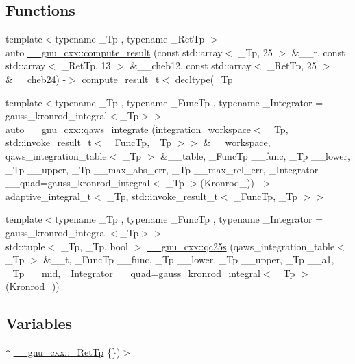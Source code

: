 \subsection*{Functions}
\begin{DoxyCompactItemize}
\item 
{\footnotesize template$<$typename \+\_\+\+Tp , typename \+\_\+\+Ret\+Tp $>$ }\\auto \hyperlink{namespace____gnu__cxx_a10e06852570922cdc1aca86883b5161e}{\+\_\+\+\_\+gnu\+\_\+cxx\+::compute\+\_\+result} (const std\+::array$<$ \+\_\+\+Tp, 25 $>$ \&\+\_\+\+\_\+r, const std\+::array$<$ \+\_\+\+Ret\+Tp, 13 $>$ \&\+\_\+\+\_\+cheb12, const std\+::array$<$ \+\_\+\+Ret\+Tp, 25 $>$ \&\+\_\+\+\_\+cheb24) -\/$>$ compute\+\_\+result\+\_\+t$<$ decltype(\+\_\+\+Tp
\item 
{\footnotesize template$<$typename \+\_\+\+Tp , typename \+\_\+\+Func\+Tp , typename \+\_\+\+Integrator  = gauss\+\_\+kronrod\+\_\+integral$<$\+\_\+\+Tp$>$$>$ }\\auto \hyperlink{namespace____gnu__cxx_a6196743b26626cc5add8395c6338f38a}{\+\_\+\+\_\+gnu\+\_\+cxx\+::qaws\+\_\+integrate} (integration\+\_\+workspace$<$ \+\_\+\+Tp, std\+::invoke\+\_\+result\+\_\+t$<$ \+\_\+\+Func\+Tp, \+\_\+\+Tp $>$$>$ \&\+\_\+\+\_\+workspace, qaws\+\_\+integration\+\_\+table$<$ \+\_\+\+Tp $>$ \&\+\_\+\+\_\+table, \+\_\+\+Func\+Tp \+\_\+\+\_\+func, \+\_\+\+Tp \+\_\+\+\_\+lower, \+\_\+\+Tp \+\_\+\+\_\+upper, \+\_\+\+Tp \+\_\+\+\_\+max\+\_\+abs\+\_\+err, \+\_\+\+Tp \+\_\+\+\_\+max\+\_\+rel\+\_\+err, \+\_\+\+Integrator \+\_\+\+\_\+quad=gauss\+\_\+kronrod\+\_\+integral$<$ \+\_\+\+Tp $>$(Kronrod\+\_)) -\/$>$ adaptive\+\_\+integral\+\_\+t$<$ \+\_\+\+Tp, std\+::invoke\+\_\+result\+\_\+t$<$ \+\_\+\+Func\+Tp, \+\_\+\+Tp $>$$>$
\item 
{\footnotesize template$<$typename \+\_\+\+Tp , typename \+\_\+\+Func\+Tp , typename \+\_\+\+Integrator  = gauss\+\_\+kronrod\+\_\+integral$<$\+\_\+\+Tp$>$$>$ }\\std\+::tuple$<$ \+\_\+\+Tp, \+\_\+\+Tp, bool $>$ \hyperlink{namespace____gnu__cxx_a5659189e193b420e201b6769d65289b9}{\+\_\+\+\_\+gnu\+\_\+cxx\+::qc25s} (qaws\+\_\+integration\+\_\+table$<$ \+\_\+\+Tp $>$ \&\+\_\+\+\_\+t, \+\_\+\+Func\+Tp \+\_\+\+\_\+func, \+\_\+\+Tp \+\_\+\+\_\+lower, \+\_\+\+Tp \+\_\+\+\_\+upper, \+\_\+\+Tp \+\_\+\+\_\+a1, \+\_\+\+Tp \+\_\+\+\_\+mid, \+\_\+\+Integrator \+\_\+\+\_\+quad=gauss\+\_\+kronrod\+\_\+integral$<$ \+\_\+\+Tp $>$(Kronrod\+\_))
\end{DoxyCompactItemize}
\subsection*{Variables}
\begin{DoxyCompactItemize}
\item 
$\ast$ \hyperlink{namespace____gnu__cxx_a886e03ece3d53ff7fa6c098a40f93fa5}{\+\_\+\+\_\+gnu\+\_\+cxx\+::\+\_\+\+Ret\+Tp} \{\})$>$
\end{DoxyCompactItemize}


